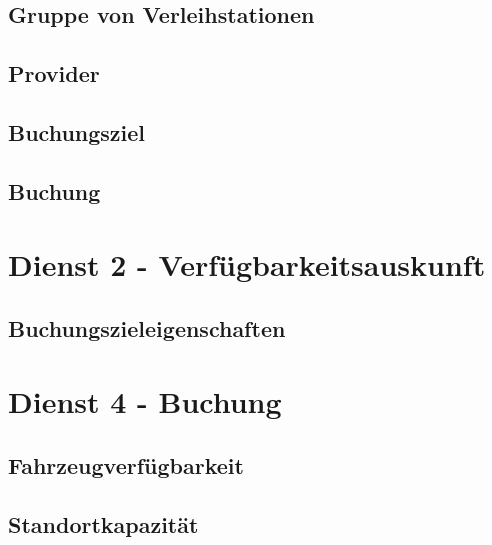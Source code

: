 \subsection*{Gruppe von Verleihstationen}



\subsection*{Provider}



\subsection*{Buchungsziel}



\subsection*{Buchung}



\section{Dienst 2 - Verfügbarkeitsauskunft}
\label{sec:Datenmodell:Dienst2}

\subsection*{Buchungszieleigenschaften}




\section{Dienst 4 - Buchung}
\label{sec:Datenmodell:Dienst4}

\subsection*{Fahrzeugverfügbarkeit}



\subsection*{Standortkapazität}



